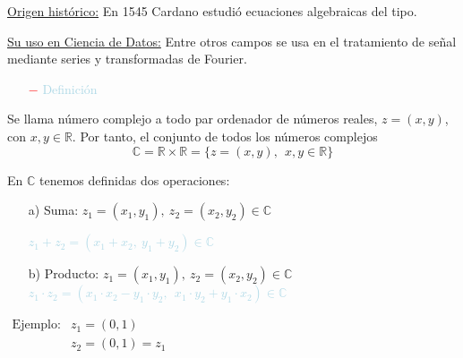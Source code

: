 \documentclass[12pt]{article}
\begin{document}
\underline{Origen histórico:} En 1545 Cardano estudió ecuaciones
algebraicas del tipo.


\underline{Su uso en Ciencia de Datos:} Entre otros campos se
usa en el tratamiento de señal mediante series y transformadas
de Fourier.

\begin{itemize}[leftmargin=*]
\item[\textcolor{red}{$-$}] \textcolor{lightblue}{Definición}\end{itemize}
Se llama número complejo a todo par ordenador de números reales,
$z=(x,y)$, con $x,y\in\mathbb{R}$. Por tanto, el conjunto de
todos los números complejos
$$\mathbb{C}=\mathbb{R}\times\mathbb{R}=\{z=(x,y),~~x,y\in\mathbb{R}\}$$


En $\mathbb{C}$ tenemos definidas dos operaciones:
\begin{enumerate}
    \item[a)] Suma: $z_1=(x_1,y_1),~z_2=(x_2,y_2)\in\mathbb{C}$

\textcolor{lightblue}{$z_1+z_2=(x_1+x_2,~y_1+y_2)\in\mathbb{C}$}
\item[b)]  Producto: $z_1=(x_1,y_1),~z_2=(x_2,y_2)\in\mathbb{C}$
\textcolor{lightblue}{$z_1\cdot z_2=(x_1\cdot x_2-y_1\cdot
y_2,~~ x_1\cdot y_2+y_1\cdot x_2)\in\mathbb{C}$}
\end{enumerate}

$\begin{array}{ll}
        \text{Ejemplo:} & z_1=(0,1)     \\
                        & z_2=(0,1)=z_1
\end{array}$\hspace{2cm}
\end{document}
